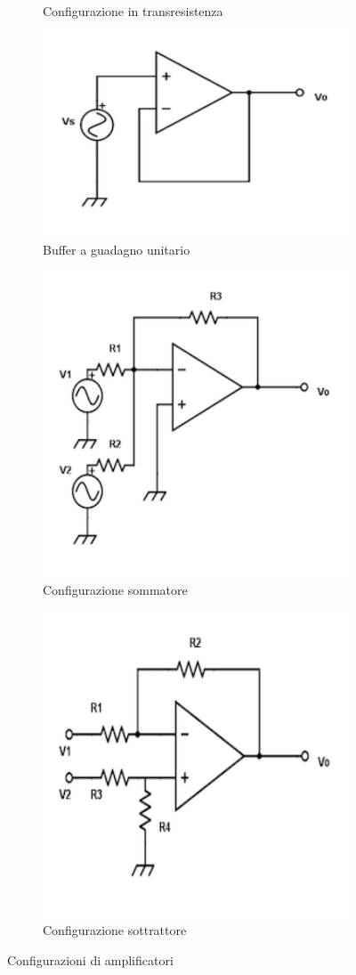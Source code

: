 \documentclass[a4paper,portrait,12pt]{article}
\theoremstyle{definition}
\begin{document}
\begin{figure}[H]
\begin{subfigure}{.5\textwidth}
\caption{Configurazione in transresistenza}
\label{transresistenza}
\end{subfigure}
\begin{subfigure}{.5\textwidth}
\centering
\includegraphics[width=.5\linewidth]{img/bufferunitario.pdf}
\caption{Buffer a guadagno unitario}
\label{fig:bufferunitario}
\end{subfigure}
\begin{subfigure}{.5\textwidth}
\centering
\includegraphics[width=.5\linewidth]{img/sommatore.pdf}
\caption{Configurazione sommatore}
\label{fig:sommatore}
\end{subfigure}
\begin{subfigure}{.5\textwidth}
\centering
\includegraphics[width=.5\linewidth]{img/sottrattore.pdf}
\caption{Configurazione sottrattore}
\label{fig:sottrattore}
\end{subfigure}
\caption{Configurazioni di amplificatori}
\end{figure}
\end{document}
